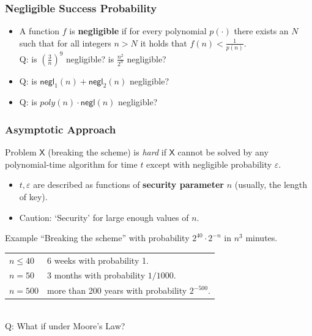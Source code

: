 \begin{frame}\frametitle{Negligible Success Probability}
\begin{itemize}
\item A function $f$ is \textbf{negligible} if for every polynomial $p(\cdot)$
there exists an $N$ such that for all integers $n > N$ it holds that $f(n) < \frac{1}{p(n)}$.\\
\alert{Q: is $\left( \frac{3}{n} \right)^{9}$ negligible? is $\frac{n^{2}}{2^{n}}$ negligible?}
\item \alert{Q: is $ \mathsf{negl}_1(n)+\mathsf{negl}_2(n)$ negligible?}
\item \alert{Q: is $ poly(n)\cdot\mathsf{negl}(n)$ negligible?}
\end{itemize}
\end{frame}
\begin{frame}\frametitle{Asymptotic Approach}
Problem $\mathsf{X}$ (breaking the scheme) is \emph{hard} if $\mathsf{X}$ cannot be solved by any polynomial-time algorithm for time $t$ except with negligible probability $\varepsilon$.
\begin{itemize}
\item $t, \varepsilon$ are described as functions of \textbf{security parameter} $n$ (usually, the length of key).%
\item \alert{Caution}: `Security' for large enough values of $n$.
\end{itemize}
\begin{exampleblock}{Example}
``Breaking the scheme'' with probability $2^{40}\cdot 2^{-n}$ in $n^3$ minutes.
\begin{tabular}{ll}
$n \le 40$ & 6 weeks with probability 1. \\
$n=50$   & 3 months with probability $1/1000$. \\
$n=500$  & more than 200 years with probability $2^{-500}$. \\
\end{tabular}\\

\alert{Q: What if under Moore's Law?} 
\end{exampleblock}
\end{frame}

